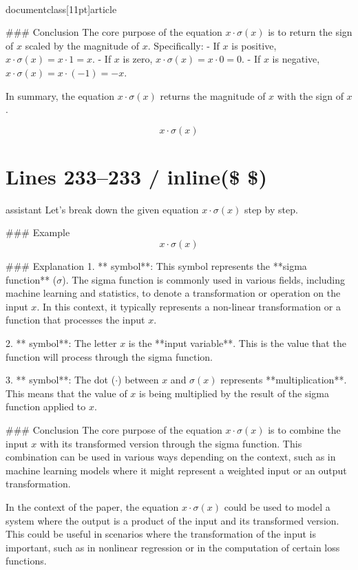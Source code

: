 \\documentclass[11pt]{article}
\begin{document}
### Conclusion
The core purpose of the equation \( x \cdot \sigma(x) \) is to return the sign of \( x \) scaled by the magnitude of \( x \). Specifically:
- If \( x \) is positive, \( x \cdot \sigma(x) = x \cdot 1 = x \).
- If \( x \) is zero, \( x \cdot \sigma(x) = x \cdot 0 = 0 \).
- If \( x \) is negative, \( x \cdot \sigma(x) = x \cdot (-1) = -x \).

In summary, the equation \( x \cdot \sigma(x) \) returns the magnitude of \( x \) with the sign of \( x \).

\[
\boxed{x \cdot \sigma(x)}
\]


\section*{Lines 233–233 / inline(\$ \$) }
assistant
Let's break down the given equation \( x \cdot \sigma(x) \) step by step.

### Example
\[ x \cdot \sigma(x) \]

### Explanation
1. ** symbol**: This symbol represents the **sigma function** (\(\sigma\)). The sigma function is commonly used in various fields, including machine learning and statistics, to denote a transformation or operation on the input \(x\). In this context, it typically represents a non-linear transformation or a function that processes the input \(x\).

2. ** symbol**: The letter \(x\) is the **input variable**. This is the value that the function will process through the sigma function.

3. ** symbol**: The dot (\(\cdot\)) between \(x\) and \(\sigma(x)\) represents **multiplication**. This means that the value of \(x\) is being multiplied by the result of the sigma function applied to \(x\).

### Conclusion
The core purpose of the equation \( x \cdot \sigma(x) \) is to combine the input \(x\) with its transformed version through the sigma function. This combination can be used in various ways depending on the context, such as in machine learning models where it might represent a weighted input or an output transformation.

In the context of the paper, the equation \( x \cdot \sigma(x) \) could be used to model a system where the output is a product of the input and its transformed version. This could be useful in scenarios where the transformation of the input is important, such as in nonlinear regression or in the computation of certain loss functions.
\end{document}
